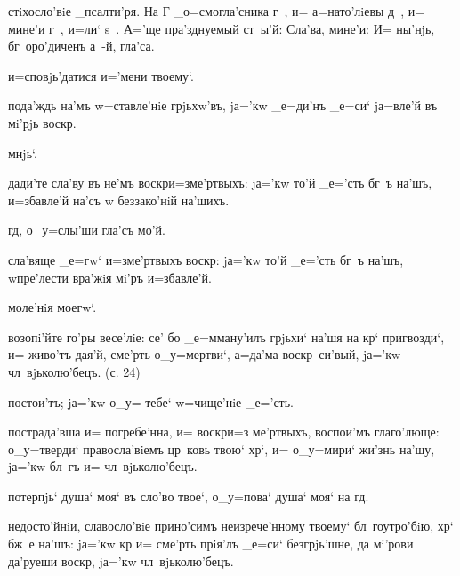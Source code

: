 
стiхосло'вiе _псалти'ря. На Г%
_о=смогла'сника г~, и= а=нато'лiевы д~, и= мине'и г~, 
и=ли` s~. А='ще пра'зднуемый ст~ы'й: Сла'ва, мине'и: И= 
ны'нjь, бг~оро'диченъ а~-й, гла'са.%


и=сповjь'датися и='мени твоему`.

пода'ждь на'мъ w=ставле'нiе грjьхw'въ, jа='кw _е=ди'нъ 
_е=си` jа=вле'й въ мi'рjь воскр.

мнjь`.

дади'те сла'ву въ не'мъ воскр и=з\ъ ме'ртвыхъ: 
jа='кw то'й _е='сть бг~ъ на'шъ, и=збавле'й на'съ w\т 
беззако'нiй на'шихъ.

гд, о_у=слы'ши гла'съ мо'й.

сла'вяще _е=гw` и=з\ъ ме'ртвыхъ воскр: jа='кw то'й 
_е='сть бг~ъ на'шъ, w\т пре'лести вра'жiя мi'ръ 
и=збавле'й.


моле'нiя моегw`.

возопi'йте го'ры весе'лiе: се' бо _е=мману'илъ грjьхи` 
на'шя на кр` пригвозди`, и= живо'тъ дая'й, сме'рть 
о_у=мертви`, а=да'ма воскр~си'вый, jа='кw 
чл~вjьколю'бецъ. (с. 24)

постои'тъ; jа='кw о_у= тебе` w=чище'нiе _е='сть.

пострада'вша и= погребе'нна, и= воскр и=з\ъ 
ме'ртвыхъ, воспои'мъ глаго'люще: о_у=тверди` 
правосла'вiемъ цр~ковь твою` хр`, и= о_у=мири` жи'знь 
на'шу, jа='кw бл~гъ и= чл~вjьколю'бецъ.

потерпjь` душа` моя` въ сло'во твое`, о_у=пова` душа` 
моя` на гд.

недосто'йнiи, славосло'вiе прино'симъ неизрече'нному 
твоему` бл~гоутро'бiю, хр` бж~е на'шъ: jа='кw кр 
и= сме'рть прiя'лъ _е=си` безгрjь'шне, да мi'рови 
да'руеши воскр, jа='кw чл~вjьколю'бецъ.

